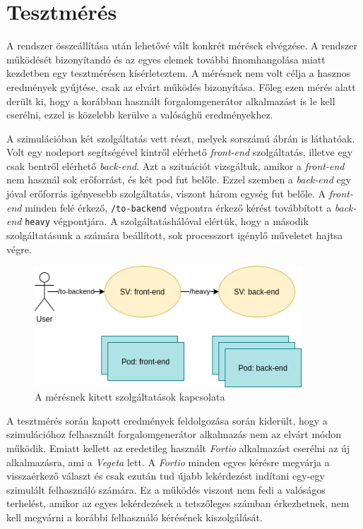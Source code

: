\section{Tesztmérés}
A rendszer összeállítása után lehetővé vált konkrét mérések elvégzése.
A rendszer működését bizonyítandó és az egyes elemek további finomhangolása miatt kezdetben egy tesztmérésen kísérleteztem.
A mérésnek nem volt célja a hasznos eredmények gyűjtése, csak az elvárt működés bizonyítása. 
Főleg ezen mérés alatt derült ki, hogy a korábban használt forgalomgenerátor alkalmazást is le kell cserélni, ezzel is közelebb kerülve a valósághű eredményekhez.

A szimulációban két szolgáltatás vett részt, melyek  sorszámú ábrán is láthatóak.
Volt egy nodeport segítségével kintről elérhető \textit{front-end} szolgáltatás, illetve egy csak bentről elérhető \textit{back-end}.
Azt a szituációt vizsgáltuk, amikor a \textit{front-end} nem használ sok erőforrást, és két pod fut belőle.
Ezzel szemben a \textit{back-end} egy jóval erőforrás igényesebb szolgáltatás, viszont három egység fut belőle.
A \textit{front-end} minden felé érkező, \verb+/to-backend+ végpontra érkező kérést továbbított a \textit{back-end} \verb+heavy+ végpontjára.
A szolgáltatáshálóval elértük, hogy a második szolgáltatásunk a számára beállított, sok processzort igénylő műveletet hajtsa végre.

\begin{figure}[!ht]
\centering
\includegraphics[width=100mm, keepaspectratio]{figures/sample_measurement.png}
\caption{A mérésnek kitett szolgáltatások kapcsolata}
\label{fig:sample_sg}
\end{figure}

A tesztmérés során kapott eredmények feldolgozása során kiderült, hogy a szimulációhoz felhasznált forgalomgenerátor alkalmazás nem az elvárt módon működik.
Emiatt kellett az eredetileg használt \textit{Fortio} alkalmazást cserélni az új alkalmazásra, ami a \textit{Vegeta} lett.
A \textit{Fortio} minden egyes kérésre megvárja a visszaérkező választ és csak ezután tud újabb lekérdezést indítani egy-egy szimulált felhasználó számára.
Ez a működés viszont nem fedi a valóságos terhelést, amikor az egyes lekérdezések a tetszőleges számban érkezhetnek, nem kell megvárni a korábbi felhasználó kérésének kiszolgálását.

